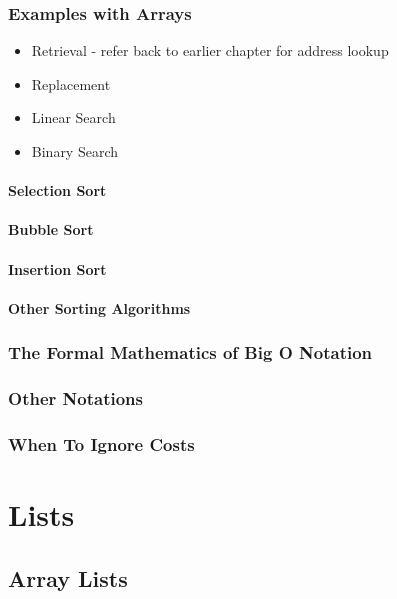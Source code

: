 \documentclass[10pt,a4paper]{book}
\begin{document}
\section{Examples with Arrays}

\begin{itemize}
	
	\item Retrieval  - refer back to earlier chapter for address lookup 
	\item Replacement
	\item Linear Search
	\item Binary Search
\end{itemize}



\subsection{Selection Sort}



\subsection{Bubble Sort}
\subsection{Insertion Sort}
\subsection{Other Sorting Algorithms}


\section{The Formal Mathematics of Big O Notation}
\section{Other Notations}


\section{When To Ignore Costs}

\part{Lists}

\chapter{Array Lists}
\label{chap-arraylist}
\end{document}

